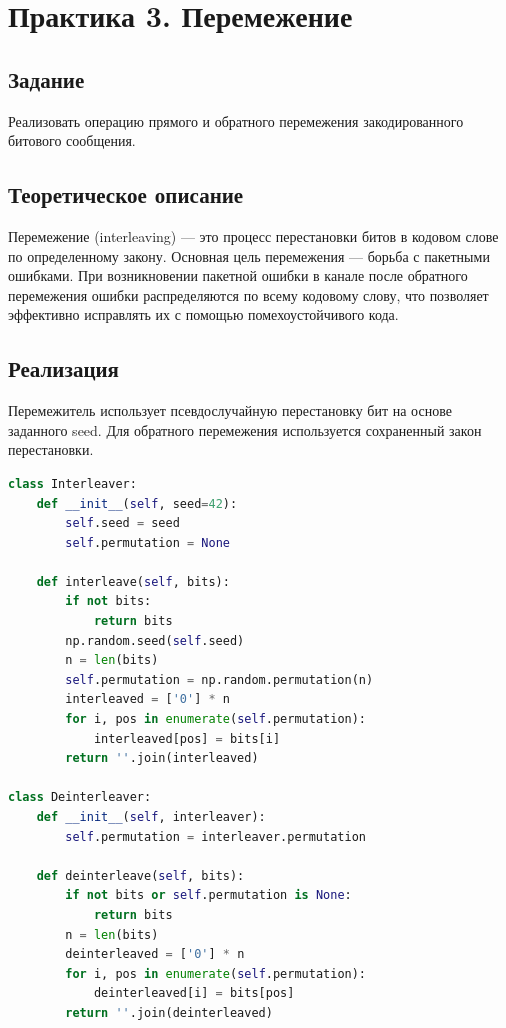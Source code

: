 \chapter{Практика 3. Перемежение}

\section{Задание}
Реализовать операцию прямого и обратного перемежения закодированного битового сообщения.

\section{Теоретическое описание}
Перемежение (interleaving) — это процесс перестановки битов в кодовом слове по определенному закону. Основная цель перемежения — борьба с пакетными ошибками. При возникновении пакетной ошибки в канале после обратного перемежения ошибки распределяются по всему кодовому слову, что позволяет эффективно исправлять их с помощью помехоустойчивого кода.

\section{Реализация}
Перемежитель использует псевдослучайную перестановку бит на основе заданного seed. Для обратного перемежения используется сохраненный закон перестановки.

\begin{lstlisting}[language=Python, caption=Перемежитель и деперемежитель]
class Interleaver:
    def __init__(self, seed=42):
        self.seed = seed
        self.permutation = None

    def interleave(self, bits):
        if not bits:
            return bits
        np.random.seed(self.seed)
        n = len(bits)
        self.permutation = np.random.permutation(n)
        interleaved = ['0'] * n
        for i, pos in enumerate(self.permutation):
            interleaved[pos] = bits[i]
        return ''.join(interleaved)

class Deinterleaver:
    def __init__(self, interleaver):
        self.permutation = interleaver.permutation

    def deinterleave(self, bits):
        if not bits or self.permutation is None:
            return bits
        n = len(bits)
        deinterleaved = ['0'] * n
        for i, pos in enumerate(self.permutation):
            deinterleaved[i] = bits[pos]
        return ''.join(deinterleaved)
\end{lstlisting}


